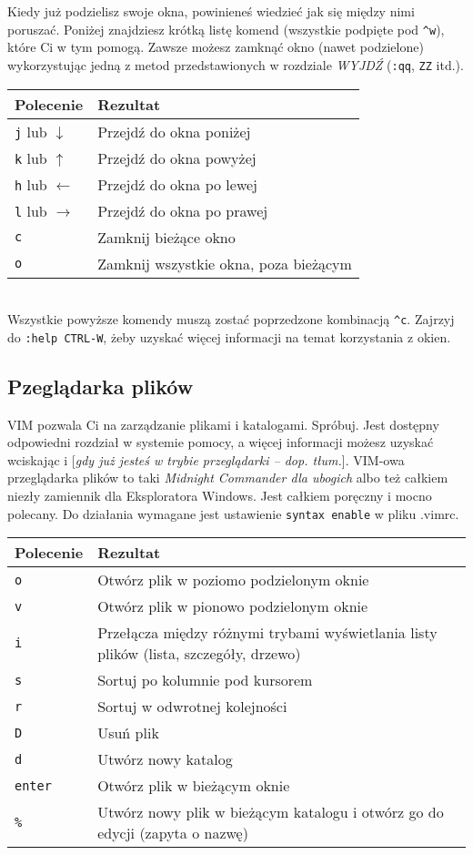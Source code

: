 \documentclass[a4paper,12pt]{article}
\begin{document}
\noindent
Kiedy już podzielisz swoje okna, powinieneś wiedzieć jak się między nimi poruszać. Poniżej znajdziesz krótką listę komend (wszystkie podpięte pod {\tt \^{}w}), które Ci w tym pomogą. Zawsze możesz zamknąć okno (nawet podzielone) wykorzystując jedną z metod przedstawionych w rozdziale {\it WYJDŹ} ({\tt :qq}, {\tt ZZ} itd.).

\begin{tabular}{ l | p{} }
{\bf Polecenie} & {\bf Rezultat} \\ \hline
{\tt j} lub {\tt $\downarrow$} & Przejdź do okna poniżej \\
{\tt k} lub {\tt $\uparrow$} & Przejdź do okna powyżej \\
{\tt h} lub {\tt $\leftarrow$} & Przejdź do okna po lewej \\
{\tt l} lub {\tt $\rightarrow$} & Przejdź do okna po prawej \\ 
{\tt c} & Zamknij bieżące okno \\
{\tt o} & Zamknij wszystkie okna, poza bieżącym \\ \hline
\end{tabular}\\

\noindent
Wszystkie powyższe komendy muszą zostać poprzedzone kombinacją {\tt \^{}c}. Zajrzyj do {\tt :help CTRL-W}, żeby uzyskać więcej informacji na temat korzystania z okien.

\subsection{Pzeglądarka plików}
VIM pozwala Ci na zarządzanie plikami i katalogami. Spróbuj. Jest dostępny odpowiedni rozdział w systemie pomocy, a więcej informacji możesz uzyskać wciskając i [{\it gdy już jesteś w trybie przeglądarki – dop. tłum.}]. VIM-owa przeglądarka plików to taki {\it Midnight Commander dla ubogich} albo też całkiem niezły zamiennik dla Eksploratora Windows. Jest całkiem poręczny i mocno polecany. Do działania wymagane jest ustawienie {\tt syntax enable} w pliku .vimrc.

\begin{tabular}{ l | p{} }
{\bf Polecenie} & {\bf Rezultat} \\ \hline
{\tt o} & Otwórz plik w poziomo podzielonym oknie \\
{\tt v} & Otwórz plik w pionowo podzielonym oknie \\
{\tt i} & Przełącza między różnymi trybami wyświetlania listy plików (lista, szczegóły, drzewo) \\
{\tt s} & Sortuj po kolumnie pod kursorem \\
{\tt r} & Sortuj w odwrotnej kolejności \\
{\tt D} & Usuń plik \\
{\tt d} & Utwórz nowy katalog \\ 
{\tt enter} & Otwórz plik w bieżącym oknie \\
{\tt \%} & Utwórz nowy plik w bieżącym katalogu i otwórz go do edycji (zapyta o nazwę) \\ \hline
\end{tabular}\\
\end{document}
